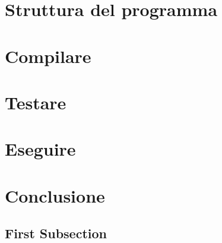 \documentclass[11pt, a4paper]{article} %
\begin{document}
\section{Struttura del programma}

\section{Compilare}
\section{Testare}  %
\section{Eseguire} %
\section{Conclusione}

\subsection{First Subsection} %
\end{document}
